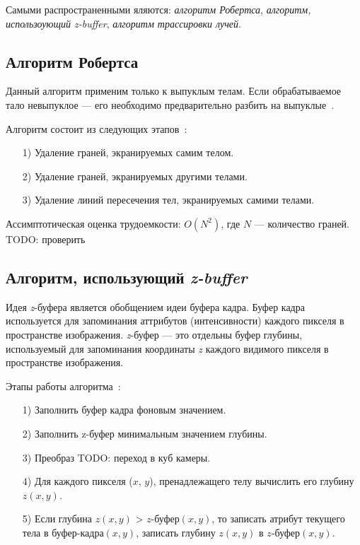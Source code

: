     Самыми распространенными яляются: \textit{алгоритм Робертса}, \textit{алгоритм, использоующий z-buffer}, \textit{алгоритм трассировки лучей}.
    
   \subsection{Алгоритм Робертса}
   
   Данный алгоритм применим только к выпуклым телам. Если обрабатываемое тало невыпуклое --- его необходимо предварительно разбить на выпуклые~\cite{rogers}.
   
   Алгоритм состоит из следующих этапов~\cite{rogers}:
   \begin{enumerate}
   	\item[1)] Удаление граней, экранируемых самим телом.
   	\item[2)] Удаление граней, экранируемых другими телами.
   	\item[3)] Удаление линий пересечения тел, экранируемых самими телами.
   \end{enumerate}
   
   Ассимптотическая оценка трудоемкости: $O(N^2)$, где $N$ --- количество граней. TODO: проверить
   
   \subsection{Алгоритм, использующий \textit{z-buffer}}
   
   Идея \textit{z}-буфера является обобщением идеи буфера кадра. Буфер кадра используется для запоминания аттрибутов (интенсивности) каждого пикселя в пространстве изображения. \textit{z}-буфер --- это отдельны буфер глубины, используемый для запоминания координаты \textit{z} каждого видимого пикселя в пространстве изображения\cite{rogers}.
   
   Этапы работы алгоритма~\cite{rogers}:
   
   \begin{enumerate}
   	\item[1)] Заполнить буфер кадра фоновым значением.
   	\item[2)] Заполнить z-буфер минимальным значением глубины.
   	\item[3)] Преобраз TODO: переход в куб камеры.
   	\item[4)] Для каждого пикселя ($x$, $y$), пренадлежащего телу вычислить его глубину $z(x, y)$.
   	\item[5)] Если глубина $z(x, y)$ > $z\textit{-буфер}(x, y)$, то записать атрибут текущего тела в $\textit{буфер-кадра}(x, y)$, записать глубину $z(x, y)$ в $z\textit{-буфер}(x, y)$.
   \end{enumerate}
   
